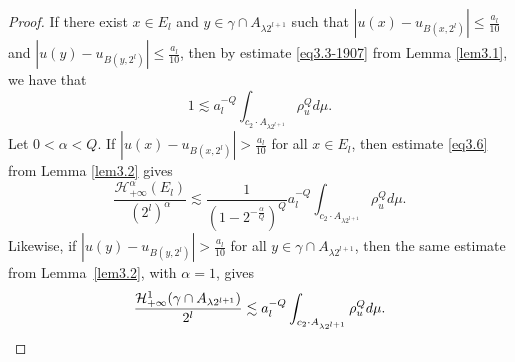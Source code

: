 \documentclass[10pt]{amsart}
\numberwithin{equation}{section}
\begin{document}
\begin{proof}
If  there exist $x\in E_l$ and $y\in\gamma\cap A_{\lambda 2^{l+1}}$ such that $|u(x)-u_{B(x,2^l)}|\le\frac{a_l}{10}$ and $|u(y)-u_{B(y,2^l)}|\le\frac{a_l}{10}$, then by estimate \eqref{eq3.3-1907} from Lemma \ref{lem3.1}, we have that 
\begin{equation}
	\label{eq3.11} 1\lesssim a_l^{-Q}\int_{c_2\cdot A_{\lambda 2^{l+1}}}\rho_u^Qd\mu. 	\end{equation}
Let $0<\alpha<Q$.
If $|u(x)-u_{B(x,2^l)}|>\frac{a_l}{10}$ for all $x\in E_l$, then estimate \eqref{eq3.6} from Lemma \ref{lem3.2} gives
 \begin{equation}
		\label{eq3.12} 
		\frac{\mathcal H^\alpha_{+\infty}(E_l)}{(2^l)^\alpha}\lesssim  \frac{1}{(1-2^{-\frac{\alpha}{Q}})^Q} a_l^{-Q}\int_{c_2\cdot A_{\lambda 2^{l+1}}}\rho_u^Qd\mu.
\end{equation}
Likewise, if $|u(y)-u_{B(y,2^l)}|>\frac{a_l}{10}$ for all $y\in \gamma\cap A_{\lambda2^{l+1}}$, then the same estimate from Lemma~\ref{lem3.2}, with $\alpha=1$, gives  
\begin{equation}\notag
			\frac{ \mathcal{H}^{1}_{+\infty} (\gamma\cap A_{\lambda 2^{l+1}})}{2^l}\lesssim a_l^{-Q}\int_{c_2\cdot A_{\lambda 2^{l+1}}}\rho_u^Qd\mu.
\end{equation} 

\end{proof}
\end{document}
